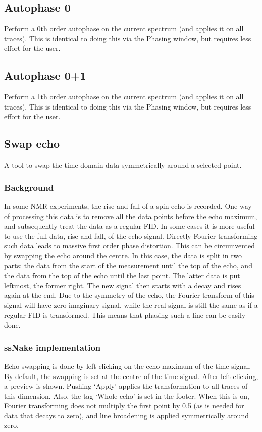 \documentclass[11pt,a4paper]{article}
\begin{document}
\subsection{Autophase 0}
Perform a 0th order autophase on the current spectrum (and applies it on all traces). This is identical to doing this via the Phasing window, but requires less effort for the user.

\subsection{Autophase 0+1}
Perform a 1th order autophase on the current spectrum (and applies it on all traces). This is identical to doing this via the Phasing window, but requires less effort for the user.


\subsection{Swap echo}
A tool to swap the time domain data symmetrically around a selected point.

\subsubsection*{Background}
In some NMR experiments, the rise and fall of a spin echo is recorded. One way of processing this data is to remove all the data points before the echo maximum, and subsequently treat the data as a regular FID. In some cases it is more useful to use the full data, rise and fall, of the echo signal. Directly Fourier transforming such data leads to massive first order phase distortion. This can be circumvented by swapping the echo around the centre. In this case, the data is split in two parts: the data from the start of the measurement until the top of the echo, and the data from the top of the echo until the last point. The latter data is put leftmost, the former right. The new signal then starts with a decay and rises again at the end. Due to the symmetry of the echo, the Fourier transform of this signal will have zero imaginary signal, while the real signal is still the same as if a regular FID is transformed. This means that phasing such a line can be easily done.

\subsubsection*{ssNake implementation}
Echo swapping is done by left clicking on the echo maximum of the time signal. By default, the swapping is set at the centre of the time signal. After left clicking, a preview is shown. Pushing `Apply' applies the transformation to all traces of this dimension. Also, the tag `Whole echo' is set in the footer. When this is on, Fourier transforming does not multiply the first point by 0.5 (as is needed for data that decays to zero), and line broadening is applied symmetrically around zero.
\end{document}
